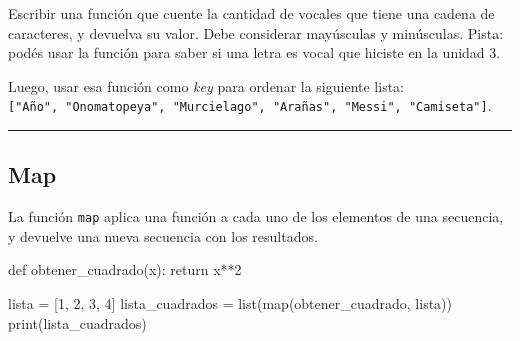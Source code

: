 \documentclass[
  letterpaper,
  DIV=11,
  numbers=noendperiod]{scrreprt}
\newenvironment{Shaded}{\begin{snugshade}}{\end{snugshade}}
\newcommand{\BuiltInTok}[1]{\textcolor[rgb]{0.00,0.23,0.31}{#1}}
\newcommand{\ControlFlowTok}[1]{\textcolor[rgb]{0.00,0.23,0.31}{#1}}
\newcommand{\DecValTok}[1]{\textcolor[rgb]{0.68,0.00,0.00}{#1}}
\newcommand{\KeywordTok}[1]{\textcolor[rgb]{0.00,0.23,0.31}{#1}}
\newcommand{\NormalTok}[1]{\textcolor[rgb]{0.00,0.23,0.31}{#1}}
\newcommand{\OperatorTok}[1]{\textcolor[rgb]{0.37,0.37,0.37}{#1}}
\begin{document}
\begin{tcolorbox}[enhanced jigsaw, colframe=quarto-callout-important-color-frame, opacityback=0, opacitybacktitle=0.6, bottomrule=.15mm, toprule=.15mm, coltitle=black, breakable, colback=white, leftrule=.75mm, titlerule=0mm, bottomtitle=1mm, toptitle=1mm, rightrule=.15mm, title=\textcolor{quarto-callout-important-color}{\faExclamation}\hspace{0.5em}{Ejercicio Desafío}, arc=.35mm, left=2mm, colbacktitle=quarto-callout-important-color!10!white]

Escribir una función que cuente la cantidad de vocales que tiene una
cadena de caracteres, y devuelva su valor. Debe considerar mayúsculas y
minúsculas. Pista: podés usar la función para saber si una letra es
vocal que hiciste en la unidad 3.

Luego, usar esa función como \emph{key} para ordenar la siguiente lista:
\texttt{{[}"Año",\ "Onomatopeya",\ "Murcielago",\ "Arañas",\ "Messi",\ "Camiseta"{]}}.\\

\end{tcolorbox}

\hfill\break

\begin{center}\rule{0.5\linewidth}{0.5pt}\end{center}

\hfill\break

\hypertarget{map}{%
\subsection{Map}\label{map}}

La función \texttt{map} aplica una función a cada uno de los elementos
de una secuencia, y devuelve una nueva secuencia con los resultados.

\begin{Shaded}
\begin{Highlighting}[]
\KeywordTok{def}\NormalTok{ obtener\_cuadrado(x):}
  \ControlFlowTok{return}\NormalTok{ x}\OperatorTok{**}\DecValTok{2}

\NormalTok{lista }\OperatorTok{=}\NormalTok{ [}\DecValTok{1}\NormalTok{, }\DecValTok{2}\NormalTok{, }\DecValTok{3}\NormalTok{, }\DecValTok{4}\NormalTok{]}
\NormalTok{lista\_cuadrados }\OperatorTok{=} \BuiltInTok{list}\NormalTok{(}\BuiltInTok{map}\NormalTok{(obtener\_cuadrado, lista))}
\BuiltInTok{print}\NormalTok{(lista\_cuadrados)}
\end{Highlighting}
\end{Shaded}
\end{document}
